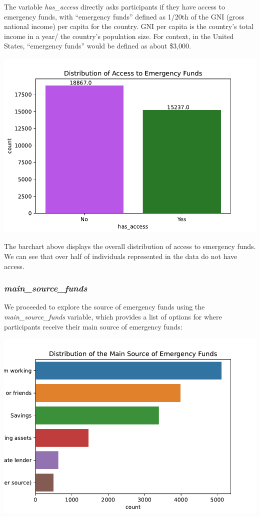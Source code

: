 \documentclass[water,article,submit,moreauthors,pdftex]{mdpi}
\begin{document}
The variable \emph{has\_access} directly asks participants if they have
access to emergency funds, with ``emergency funds'' defined as 1/20th of
the GNI (gross national income) per capita for the country. GNI per
capita is the country's total income in a year/ the country's population
size. For context, in the United States, ``emergency funds'' would be
defined as about \$3,000.

\includegraphics{term_paper_files/figure-latex/unnamed-chunk-14-11.pdf}

The barchart above displays the overall distribution of access to
emergency funds. We can see that over half of individuals represented in
the data do not have access.

\hypertarget{main_source_funds}{%
\subsubsection{\texorpdfstring{\emph{main\_source\_funds}}{main\_source\_funds}}\label{main_source_funds}}

We proceeded to explore the source of emergency funds using the
\emph{main\_source\_funds} variable, which provides a list of options
for where participants receive their main source of emergency funds:

\includegraphics{term_paper_files/figure-latex/unnamed-chunk-15-13.pdf}
\end{document}
